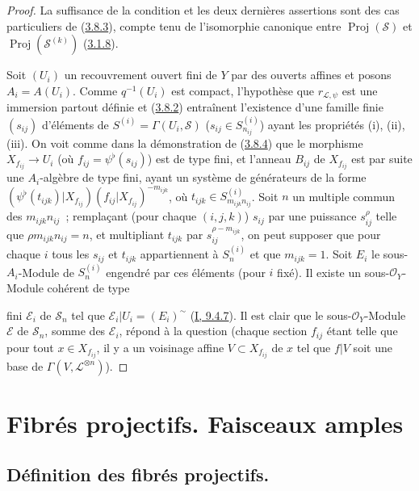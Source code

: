 \begin{proof}
La suffisance de la condition et les deux dernières assertions sont des cas
particuliers de (\hyperref[II.3.8.3-fr]{3.8.3}), compte tenu de l'isomorphie
canonique entre $\operatorname{Proj}(\mathcal{S})$ et
$\operatorname{Proj}(\mathcal{S}^{(k)})$
(\hyperref[II.3.1.8-fr]{3.1.8}).

Soit $(U_i)$ un recouvrement ouvert fini de $Y$ par des ouverts affines et
posons $A_i=A(U_i)$. Comme $q^{-1}(U_i)$ est compact, l'hypothèse que
$r_{\mathcal{L},\psi}$ est une immersion partout définie et
(\hyperref[II.3.8.2-fr]{3.8.2}) entraînent l'existence d'une famille finie
$(s_{ij})$ d'éléments de
$S^{(i)}=\Gamma(U_i,\mathcal{S})$ ($s_{ij}\in S_{n_{ij}}^{(i)}$) ayant les
propriétés (i), (ii), (iii). On voit comme dans la démonstration de
(\hyperref[II.3.8.4-fr]{3.8.4}) que le morphisme $X_{f_{ij}}\to U_i$ (où
$f_{ij}=\psi^\flat(s_{ij})$) est de type fini, et l'anneau $B_{ij}$ de
$X_{f_{ij}}$ est par suite une $A_i$-algèbre de type fini, ayant un système de
générateurs de la forme
$(\psi^\flat(t_{ijk})|X_{f_{ij}})(f_{ij}|X_{f_{ij}})^{-m_{ijk}}$, où
$t_{ijk}\in S_{m_{ijk}n_{ij}}^{(i)}$. Soit $n$ un multiple commun des
$m_{ijk}n_{ij}$~; remplaçant (pour chaque $(i,j,k)$) $s_{ij}$ par une
puissance $s_{ij}^\rho$ telle que $\rho m_{ijk}n_{ij}=n$, et multipliant
$t_{ijk}$ par $s_{ij}^{\rho-m_{ijk}}$, on peut supposer que pour chaque $i$
tous les $s_{ij}$ et $t_{ijk}$ appartiennent à $S_n^{(i)}$ et que
$m_{ijk}=1$. Soit $E_i$ le sous-$A_i$-Module de $S_n^{(i)}$ engendré par ces
éléments (pour $i$ fixé). Il existe un sous-$\mathcal{O}_Y$-Module cohérent de
type


fini $\mathcal{E}_i$ de $\mathcal{S}_n$ tel que
$\mathcal{E}_i|U_i=(E_i)^{\sim}$
(\hyperref[I.9.4.7-fr]{I, 9.4.7}). Il est clair que le
sous-$\mathcal{O}_Y$-Module $\mathcal{E}$ de $\mathcal{S}_n$, somme des
$\mathcal{E}_i$, répond à la question (chaque section $f_{ij}$ étant telle
que pour tout $x\in X_{f_{ij}}$, il y a un voisinage affine
$V\subset X_{f_{ij}}$ de $x$ tel que $f|V$ soit une base de
$\Gamma(V,\mathcal{L}^{\otimes n})$).
\end{proof}

\section{Fibrés projectifs. Faisceaux amples}
\label{section:II.4-fr}

\subsection{Définition des fibrés projectifs.}
\label{subsection:II.4.1-fr}

